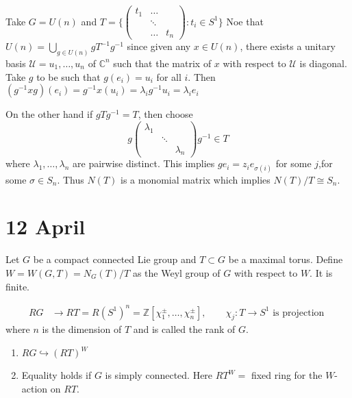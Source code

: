 \documentclass[11pt,a4paper]{scrarticle}
\theoremstyle{definition}
\theoremstyle{greenbox}
\newcommand{\Z}{\mathbb{Z}}
\newcommand{\C}{\mathbb{C}}
\begin{document}
 \begin{example}
    Take $ G = U(n) $ and $ T = \biggl\{ \begin{pmatrix} t_{1}&  \hdots &   \\
        & \ddots & \\
    & \hdots & t_{n} \end{pmatrix} : t_{i} \in S^{1} \biggr\} $ Noe that $ U(n) = \bigcup_{g \in U(n)}gT^{-1}g^{-1} $ since given any $ x \in U(n) $, there exists a unitary basis $ \mathcal{U} = u_{1}, \dots, u_{n} $ of $ \C^{n} $ such that the matrix of $ x $ with respect to $ \mathcal{U} $ is diagonal. Take $ g $ to be such that $ g(e_{i}) = u_{i} $ for all $ i $. Then $ (g^{-1}xg)(e_{i}) = g^{-1}x(u_{i}) = \lambda_{i}g^{-1}u_{i}  = \lambda_{i}e_{i}$ 

    On the other hand if $ gTg^{-1}=T $, then choose 
    \[ g \begin{pmatrix}
        \lambda_{1} & & \\
        & \ddots & \\
        & & \lambda_{n}
    \end{pmatrix}g^{-1} \in T \]
    where $ \lambda_{1}, \dots, \lambda_{n} $ are pairwise distinct. This implies $ ge_{i} = z_{i}e_{\sigma(i)} $ for some $ j $,for some $ \sigma \in S_{n} $. Thus $ N(T) $ is a monomial matrix which implies $ N(T) /T \cong S_{n} $. 
 \end{example}

 \section{12 April}

 Let $ G $ be a compact connected Lie group and $ T \subset G $  be a maximal torus. Define $ W = W(G,T) = N_{G}(T) / T $ as the Weyl group of $ G  $ with respect to $ W $. It is finite. 


 \begin{align*}
    RG & \to RT = R(S^{1})^{n} = \Z[ \chi_{1}^{\pm}, \dots, \chi_{n}^{\pm}] , \qquad \chi_{j} : T \to S^{1} \text{ is projection }
 \end{align*}
 where $ n $ is the dimension of $ T $ and is called the rank of $ G $. \begin{thm}
    \begin{enumerate}
        \item $ RG \hookrightarrow (RT)^{W} $
        \item Equality holds if $ G $ is simply connected. Here $ RT^{W} = $ fixed ring for the $ W $-action on $ RT $. 
    \end{enumerate}
 \end{thm}
\end{document}
